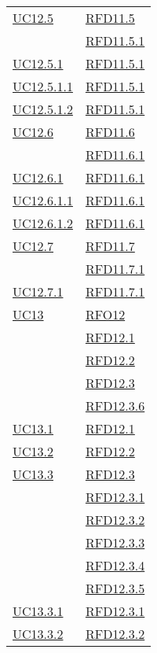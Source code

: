 \begin{longtable}{|>{\centering}m{5cm}|m{5cm}<{\centering}|}
\hyperref[UC12.5]{UC12.5} & \hyperlink{RFD11.5}{RFD11.5}\\
& \hyperlink{RFD11.5.1}{RFD11.5.1}\\ \hline
\hyperref[UC12.5.1]{UC12.5.1} & \hyperlink{RFD11.5.1}{RFD11.5.1}\\ \hline
\hyperref[UC12.5.1.1]{UC12.5.1.1} & \hyperlink{RFD11.5.1}{RFD11.5.1}\\ \hline
\hyperref[UC12.5.1.2]{UC12.5.1.2} & \hyperlink{RFD11.5.1}{RFD11.5.1}\\ \hline
\hyperref[UC12.6]{UC12.6} & \hyperlink{RFD11.6}{RFD11.6}\\
& \hyperlink{RFD11.6.1}{RFD11.6.1}\\ \hline
\hyperref[UC12.6.1]{UC12.6.1} & \hyperlink{RFD11.6.1}{RFD11.6.1}\\ \hline
\hyperref[UC12.6.1.1]{UC12.6.1.1} & \hyperlink{RFD11.6.1}{RFD11.6.1}\\ \hline
\hyperref[UC12.6.1.2]{UC12.6.1.2} & \hyperlink{RFD11.6.1}{RFD11.6.1}\\ \hline
\hyperref[UC12.7]{UC12.7} & \hyperlink{RFD11.7}{RFD11.7}\\
& \hyperlink{RFD11.7.1}{RFD11.7.1}\\ \hline
\hyperref[UC12.7.1]{UC12.7.1} & \hyperlink{RFD11.7.1}{RFD11.7.1}\\ \hline
\hyperref[UC13]{UC13} & \hyperlink{RFO12}{RFO12}\\
& \hyperlink{RFD12.1}{RFD12.1}\\
& \hyperlink{RFD12.2}{RFD12.2}\\
& \hyperlink{RFD12.3}{RFD12.3}\\
& \hyperlink{RFD12.3.6}{RFD12.3.6}\\ \hline
\hyperref[UC13.1]{UC13.1} & \hyperlink{RFD12.1}{RFD12.1}\\ \hline
\hyperref[UC13.2]{UC13.2} & \hyperlink{RFD12.2}{RFD12.2}\\ \hline
\hyperref[UC13.3]{UC13.3} & \hyperlink{RFD12.3}{RFD12.3}\\
& \hyperlink{RFD12.3.1}{RFD12.3.1}\\
& \hyperlink{RFD12.3.2}{RFD12.3.2}\\
& \hyperlink{RFD12.3.3}{RFD12.3.3}\\
& \hyperlink{RFD12.3.4}{RFD12.3.4}\\
& \hyperlink{RFD12.3.5}{RFD12.3.5}\\ \hline
\hyperref[UC13.3.1]{UC13.3.1} & \hyperlink{RFD12.3.1}{RFD12.3.1}\\ \hline
\hyperref[UC13.3.2]{UC13.3.2} & \hyperlink{RFD12.3.2}{RFD12.3.2}\\ \hline

\end{longtable}
